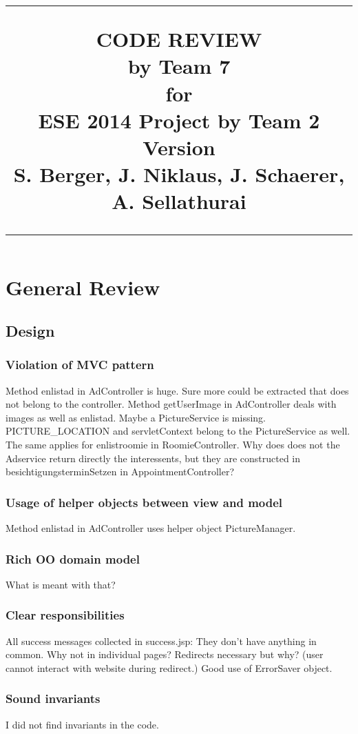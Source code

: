 \documentclass{scrreprt}
\title{%
\flushright
\rule{16cm}{5pt}\vskip1cm
\Huge{CODE REVIEW\\ by Team 7}\\
\vspace{2cm}
for\\
\vspace{2cm}
ESE 2014 Project by Team 2\\
\vspace{2cm}
\LARGE{Version \myversion \\}
\vspace{2cm}
S. Berger, J. Niklaus, J. Schaerer, A. Sellathurai \\
\vfill
\rule{16cm}{5pt}
}
\date{}
\begin{document}
\maketitle
\tableofcontents

\chapter{General Review}
\section{Design}
\subsection{Violation of MVC pattern}
Method enlistad in AdController is huge. Sure more could be extracted that does not belong to the controller. Method getUserImage in AdController deals with images as well as enlistad. Maybe a PictureService is missing. PICTURE_LOCATION and servletContext belong to the PictureService as well. The same applies for enlistroomie in RoomieController. Why does does not the Adservice return directly the interessents, but they are constructed in besichtigungsterminSetzen in AppointmentController?

\subsection{Usage of helper objects between view and model}
Method enlistad in AdController uses helper object PictureManager.

\subsection{Rich OO domain model}
What is meant with that?

\subsection{Clear responsibilities}
All success messages collected in success.jsp: They don't have anything in common. Why not in individual pages? Redirects necessary but why? (user cannot interact with website during redirect.) Good use of ErrorSaver object.

\subsection{Sound invariants}
I did not find invariants in the code.
\end{document}
